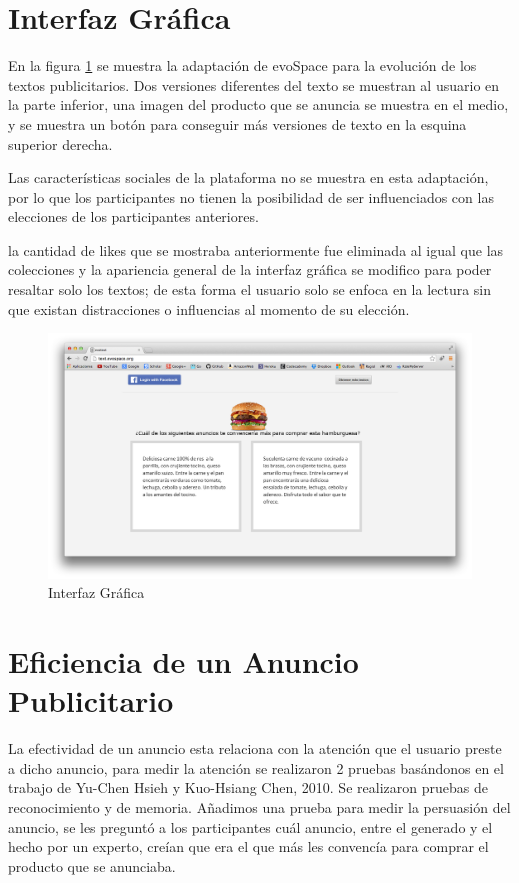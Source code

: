 \clearpage
\section{Interfaz Gráfica}

En la figura \ref{interfaz} se muestra la adaptación de evoSpace para la evolución de los textos publicitarios. Dos versiones diferentes del texto se muestran al usuario en la parte inferior, una imagen del producto que se anuncia se muestra en el medio, y se muestra un botón para conseguir más versiones de texto en la esquina superior derecha.

Las características sociales de la plataforma no se muestra en esta adaptación, por lo que  los participantes no tienen la posibilidad de ser influenciados con las elecciones de los participantes anteriores. 

la cantidad de likes que se mostraba anteriormente fue eliminada al igual que las colecciones y la apariencia general de la interfaz gráfica se modifico para poder resaltar solo los textos; de esta forma el usuario solo se enfoca en la lectura sin que existan distracciones o influencias al momento de su elección.
 

\begin{figure}[htp]
  \centerline{\includegraphics[width=7in]{interfaz.png}} 
  \caption{Interfaz Gráfica} 
\label{interfaz}
\end{figure}

\clearpage
\section{Eficiencia de un Anuncio Publicitario}

La efectividad de un anuncio esta relaciona con la atención que el usuario preste a dicho anuncio, para medir la atención se realizaron 2 pruebas basándonos en el trabajo de Yu-Chen Hsieh y Kuo-Hsiang Chen, 2010. Se realizaron pruebas de reconocimiento y de memoria. Añadimos una prueba para medir la persuasión del anuncio, se les preguntó a los participantes cuál anuncio, entre el generado y el hecho por un experto, creían que era el que más les convencía para comprar el producto que se anunciaba.